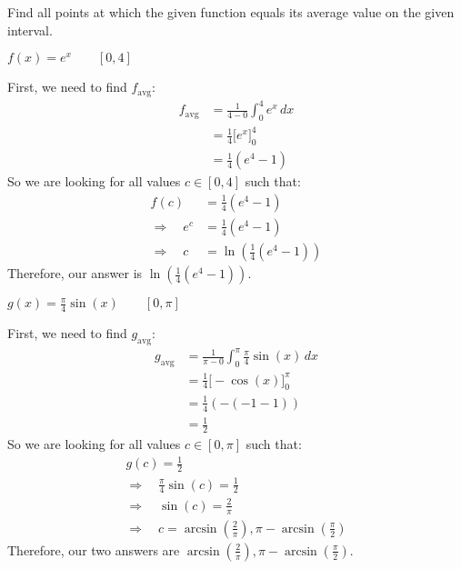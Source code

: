 \documentclass[handout, nooutcomes]{ximera}
\renewenvironment{freeResponse}{
\ifhandout\setbox0\vbox\bgroup\else
\begin{trivlist}\item[\hskip \labelsep\bfseries Solution:\hspace{2ex}]
\fi}
{\ifhandout\egroup\else
\end{trivlist}
\fi}
\renewcommand{\d}{\,d}
\newcommand{\eval}[1]{\bigg[ #1 \bigg]}
\begin{document}
\begin{problem}
  Find all points at which the given function equals its average value on the given interval.
  \begin{enumerate}
    \item
      $f(x) = e^x	\qquad	[0,4]$
      \begin{freeResponse}
        First, we need to find $f_{\text{avg}}$:
        \begin{align*}
          f_{\text{avg}} &= \frac{1}{4-0} \int_0^4 e^x \d x  \\
                         &= \frac{1}{4} \eval{e^x}_0^4  \\
                         &= \frac{1}{4} \left( e^4 - 1 \right)  
        \end{align*}
        So we are looking for all values $c \in [0,4]$ such that:
        \begin{align*}
          f(c) &= \frac{1}{4} (e^4 - 1)  \\
          \Longrightarrow \quad e^c &= \frac{1}{4} (e^4 - 1)  \\
          \Longrightarrow \quad c &= \ln \left( \frac{1}{4} (e^4 - 1) \right)
        \end{align*}
        Therefore, our answer is $\ln \left( \frac{1}{4} (e^4 - 1) \right)$.
      \end{freeResponse}

    \item
      $g(x) = \frac{\pi}{4} \sin(x)	\qquad	[0,\pi]$
      \begin{freeResponse}
        First, we need to find $g_{\text{avg}}$:
        \begin{align*}
          g_{\text{avg}} &= \frac{1}{\pi-0} \int_0^{\pi} \frac{\pi}{4} \sin(x) \d x  \\
                         &= \frac{1}{4} \eval{-\cos(x)}_0^{\pi}  \\
                         &= \frac{1}{4} \left( - (-1-1) \right)  \\
                         &= \frac{1}{2}
        \end{align*}
        So we are looking for all values $c \in [0,\pi]$ such that:
        \begin{align*}
          &g(c) = \frac{1}{2}  \\
          &\Longrightarrow \quad \frac{\pi}{4} \sin(c) = \frac{1}{2}  \\
          &\Longrightarrow \quad \sin(c) = \frac{2}{\pi}  \\
          &\Longrightarrow \quad c = \arcsin \left( \frac{2}{\pi} \right), \pi - \arcsin \left( \frac{\pi}{2} \right)
          &\end{align*}
        Therefore, our two answers are $\arcsin \left( \frac{2}{\pi} \right), \pi - \arcsin \left( \frac{\pi}{2} \right)$.
    \end{freeResponse}
  \end{enumerate}
\end{problem}
\end{document}
